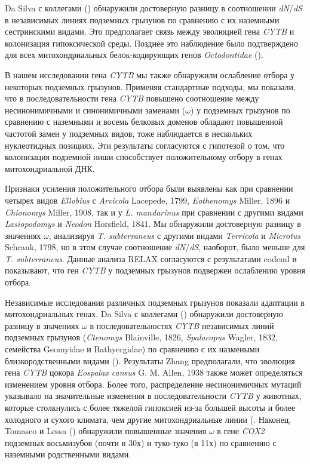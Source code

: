 Da Silva с коллегами (\cite{DaSilva2009}) обнаружили достоверную разницу в соотношении \textit{dN}/\textit{dS} в независимых линиях подземных грызунов по сравнению с их наземными сестринскими видами. Это предполагает связь между эволюцией гена \textit{CYTB} и колонизация гипоксической среды. Позднее это наблюдение было подтверждено для всех митохондриальных белок-кодирующих генов \textit{Octodontidae} (\cite{Tomasco2011}).

В нашем исследовании гена \textit{CYTB} мы также обнаружили ослабление отбора у некоторых подземных грызунов. Применяя стандартные подходы, мы показали, что в последовательности гена \textit{CYTB} повышено соотношение между несинонимичными и синонимичными заменами ($\omega$) у подземных грызунов по сравнению с наземными и восемь белковых доменов обладают повышенной частотой замен у подземных видов, тоже наблюдается в нескольких нуклеотидных позициях. Эти результаты согласуются с гипотезой о том, что колонизация подземной ниши способствует положительному отбору в генах митохондриальной ДНК.

Признаки усиления положительного отбора были выявлены как при сравнении четырех видов \textit{Ellobius} с \textit{Arvicola} Lacepede, 1799, \textit{Eothenomys} Miller, 1896 и \textit{Chionomys} Miller, 1908, так и у \textit{L. mandarinus} при сравнении с другими видами \textit{Lasiopodomys} и \textit{Neodon} Horsfield, 1841. Мы обнаружили достоверную разницу в значениях $\omega$, анализируя \textit{T. subterraneus} с другими видами \textit{Terricola} и \textit{Microtus} Schrank, 1798, но в этом случае соотношение \textit{dN}/\textit{dS}, наоборот, было меньше для \textit{T. subterraneus}. Данные анализа RELAX согласуются с результатами codeml и показывают, что ген \textit{CYTB} у подземных грызунов подвержен ослаблению уровня отбора.

Независимые исследования различных подземных грызунов показали адаптации в митохондриальных генах. Da Silva с коллегами (\cite{DaSilva2009}) обнаружили достоверную разницу в значениях $\omega$ в последовательностях \textit{CYTB} независимых линий подземных грызунов (\textit{Ctenomys} Blainville, 1826, \textit{Spalacopus} Wagler, 1832, семейства Geomyidae и Bathyergidae) по сравнению с их назмеными близкородственными видами (\cite{Tomasco2014}). Результаты Zhang предполагали, что эволюция гена \textit{CYTB} цокора \textit{Eospalax cansus} G. M. Allen, 1938 также может определяться изменением уровня отбора. Более того, распределение несинонимичных мутаций указывало на значительные изменения в последовательности \textit{CYTB} у животных, которые столкнулись с более тяжелой гипоксией из-за большей высоты и более холодного и сухого климата, чем другие митохондриальные линии (\cite{Zhang2013a}. Наконец, Tomasco и Lessa (\cite{Tomasco2011}) обнаружили повышенные значения $\omega$ в гене \textit{COX2} подземных восьмизубов (почти в 30х) и туко-туко (в 11х) по сравнению с наземными родственными видами. 


